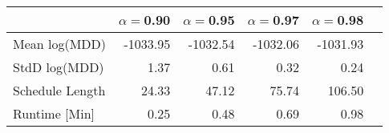\begin{tabular} {lrrrrr} 
 \hline \hline 
&$\alpha = $0.90&$\alpha = $0.95&$\alpha = $0.97&$\alpha = $0.98\\ 
 \hline 
Mean log(MDD)&-1033.95&-1032.54&-1032.06&-1031.93\\ 
StdD log(MDD)&1.37&0.61&0.32&0.24\\ 
Schedule Length&24.33&47.12&75.74&106.50\\ 
Runtime [Min]&0.25&0.48&0.69&0.98\\ 
\hline 
\end{tabular}